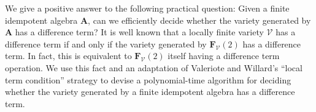 We give a positive answer to the following practical question: Given a finite idempotent algebra $\mathbf A$, can we efficiently decide whether the variety generated by $\mathbf A$ has a difference term?  It is well known that a locally finite variety $\mathcal V$ has a difference term if and only if the variety generated by $\mathbf{F}_{\mathcal V}(2)$ has a difference term.  In fact, this is equivalent to $\mathbf{F}_{\mathcal V}(2)$ itself having a difference term operation.  We use this fact and an adaptation of Valeriote and Willard's ``local term condition'' strategy to devise a polynomial-time algorithm for deciding whether the variety generated by a finite idempotent algebra has a difference term.
